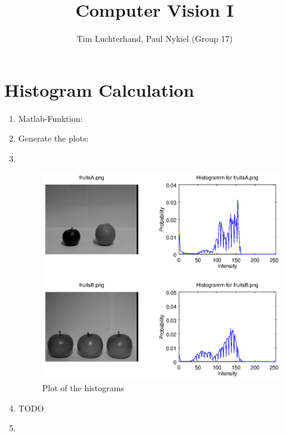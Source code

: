 \documentclass[DIN, pagenumber=false, fontsize=11pt, parskip=half]{scrartcl}
\title{Computer Vision I}
\author{Tim Luchterhand, Paul Nykiel (Group 17)}
\begin{document}
    \maketitle
    \section{Histogram Calculation}
    \begin{enumerate}
        \item Matlab-Funktion: 
        \item Generate the plots: 
        \item  $ $
            \begin{figure}[H]
                \centering
                \includegraphics[trim = {0 9cm 27cm 0}, clip,width=\textwidth]{Histograms}
                \caption{Plot of the histograms}
            \end{figure} 
        \item TODO
        \item $ $
            \begin{figure}[H]
                \centering

\end{figure}
\end{enumerate}
\end{document}
